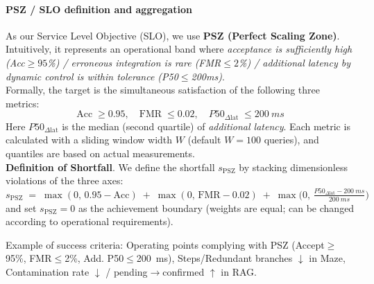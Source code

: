 \documentclass[12pt]{article}
\begin{document}
\paragraph{PSZ / SLO definition and aggregation}
As our Service Level Objective (SLO), we use \textbf{PSZ (Perfect Scaling Zone)}. Intuitively, it represents an operational band where \emph{acceptance is sufficiently high (Acc$\ge95$\%) / erroneous integration is rare (FMR$\le2$\%) / additional latency by dynamic control is within tolerance (P50$\le$200ms)}.
\\
\noindent Formally, the target is the simultaneous satisfaction of the following three metrics:
\begin{equation}
  \mathrm{Acc}\;\ge 0.95,\quad \mathrm{FMR}\;\le 0.02,\quad P50_{\Delta \mathrm{lat}}\;\le \SI{200}{ms} \label{eq:psz_targets}
\end{equation}
Here $P50_{\Delta \mathrm{lat}}$ is the median (second quartile) of \emph{additional latency}. Each metric is calculated with a sliding window width $W$ (default $W{=}100$ queries), and quantiles are based on actual measurements.
\\
\noindent \textbf{Definition of Shortfall}. We define the shortfall $s_{\mathrm{PSZ}}$ by stacking dimensionless violations of the three axes:
\begin{equation}
  s_{\mathrm{PSZ}}\;=\;\max(0,\,0.95{-}\mathrm{Acc})\; +\; \max(0,\,\mathrm{FMR}{-}0.02)\; +\; \max\!\bigl(0,\,\tfrac{P50_{\Delta \mathrm{lat}}{-}\SI{200}{ms}}{\SI{200}{ms}}\bigr) \label{eq:psz_deficit}
\end{equation}
and set $s_{\mathrm{PSZ}}{=}0$ as the achievement boundary (weights are equal; can be changed according to operational requirements).

\noindent Example of success criteria: Operating points complying with PSZ (Accept$\ge$95\%, FMR$\le$2\%, Add. P50$\le$\SI{200}{ms}), Steps/Redundant branches $\downarrow$ in Maze, Contamination rate $\downarrow$ / pending$\to$confirmed $\uparrow$ in RAG.
\end{document}
